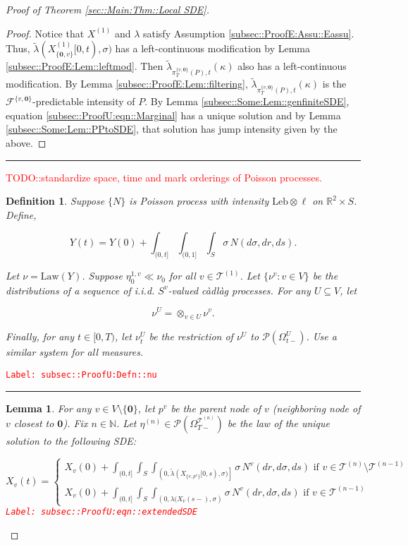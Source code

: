\documentclass[12pt]{article}
\newcommand{\mb}{\mathbb}
\newcommand{\mc}{\mathcal}
\newcommand{\ov}{\overline}
\newcommand{\te}{\text}
\newcommand{\tr}{\textcolor{red}}
\newcommand{\labe}[1]{\tr{\texttt{Label: #1}}}
\newcommand{\lin}{\rule{\linewidth}{0.4 pt}}
\newcommand{\pmsr}{\mc{P}}							%
\renewcommand{\root}{\mathbf{0}}				%
\renewcommand{\v}{v}							%
\renewcommand{\U}{U}							%
\renewcommand{\S}{S}							%
\newcommand{\s}{\sigma}							%
\newcommand{\T}{T}								%
\renewcommand{\t}{t}							%
\newcommand{\sset}{\Omega}						%
\newcommand{\proj}{\pi}							%
\renewcommand{\tt}{s}							%
\newcommand{\F}{\mc{F}}							%
\newcommand{\X}{X}								%
\newcommand{\vind}[1]{^{#1}}					%
\newcommand{\carp}[1]{^{#1}}					%
\newcommand{\vsi}[1]{^{#1}}						%
\newcommand{\cind}[1]{_{#1}}					%
\newcommand{\cl}{\ov}							%
\newcommand{\tp}[1]{(#1)}						%
\newcommand{\tip}[1]{#1}						%
\newcommand{\ts}[1]{_{#1}}						%
\newcommand{\slnvind}[2]{^{#1,#2}}				%
\newcommand{\tree}{\mc{T}}						%
\newcommand{\sln}[1]{^{(#1)}}					%
\newcommand{\poiss}{N}							%
\newcommand{\leb}{\te{Leb}}						%
\newcommand{\Sm}{\ell}							%
\newcommand{\rate}{\lambda}						%
\renewcommand{\r}{r}							%
\newcommand{\alt}[1]{\widetilde{#1}}			%
\newcommand{\pra}[1]{_{#1}}						%
\newcommand{\mm}{\nu}							%
\newcommand{\mmm}{\eta}							%
\newcommand{\law}{\te{Law}}						%
\newcommand{\XX}{Y}								%
\renewcommand{\mark}{\kappa}					%
\newcommand{\rp}{P}								%
\newcommand{\crate}{\alt{\lambda}}				%
\newcommand{\p}{p}								%
\newcommand{\prats}[2]{_{#1,#2}}				%
\newtheorem{lem}[thms]{Lemma}
\newtheorem{defn}[thms]{Definition}
\begin{document}
\begin{proof}[Proof of Theorem \ref{sec::Main:Thm::Local SDE}]
\begin{proof}
Notice that \(\X\sln{1}\) and \(\rate\) satisfy Assumption \ref{subsec::ProofE:Assu::Eassu}. Thus, \(\crate(\X\sln{1}\cind{\{\root,\v\}}\tip{[0,\t)},\s)\) has a left-continuous modification by Lemma \ref{subsec::ProofE:Lem::leftmod}. Then \(\crate\prats{\proj\vsi{\{\v,\root\}}\ts{\T}(\rp)}{\t}(\mark)\) also has a left-continuous modification. By Lemma \ref{subsec::ProofE:Lem::filtering}, \(\crate\prats{\proj\vsi{\{\v,\root\}}\ts{\T}(\rp)}{\t}(\kappa)\) is the \(\F\vsi{\{\v,\root\}}\)-predictable intensity of \(\rp\). By Lemma \ref{subsec::Some:Lem::genfiniteSDE}, equation \eqref{subsec::ProofU:eqn::Marginal} has a unique solution and by Lemma \ref{subsec::Some:Lem::PPtoSDE}, that solution has jump intensity given by the above.

\end{proof}

\lin

\tr{TODO::standardize space, time and mark orderings of Poisson processes.}

\begin{defn}
Suppose \(\{\poiss\}\) is Poisson process with intensity \(\leb\otimes \Sm\) on \(\mb{R}^2\times \S\). Define,

\[\XX\tp{\t} = \XX\tp{0} + \int_{(0,\t]}\int_{(0,1]}\int_\S\s\,\poiss(d\s,d\r,d\tt).\]

Let \(\mm = \law(\XX)\). Suppose \(\mmm\slnvind{1}{\v}\ts{0}\ll\mm\ts{0}\) for all \(\v\in\tree\sln{1}\). Let \(\{\mm\vind{\v}:\v\in V\}\) be the distributions of a sequence of i.i.d. \(\S\carp{\v}\)-valued c\`adl\`ag processes. For any \(\U\subseteq V\), let 

\[\mm\vind{\U} = \otimes_{\v\in\U} \mm\vind{\v}.\]

Finally, for any \(\t\in [0,\T)\), let \(\mm\vind{\U}\ts{\t}\) be the restriction of \(\mm\vind{\U}\) to \(\pmsr(\sset\vsi{\U}\ts{\t-})\). Use a similar system for all measures.
\label{subsec::ProofU:Defn::nu}
\end{defn}
\labe{subsec::ProofU:Defn::nu}

\lin

\begin{lem}
For any \(\v \in V\setminus\{\root\}\), let \(\p\vind{\v}\) be the parent node of \(\v\) (neighboring node of \(\v\) closest to \(\root\)). Fix \(n \in \mb{N}\). Let \(\mmm\sln{n} \in \pmsr\left(\sset\vsi{\tree\sln{n}}\ts{\T-}\right)\) be the law of the unique solution to the following SDE:

\begin{equation}
\X\cind{\v}\tp{\t} = \begin{cases}
\X\cind{\v}\tp{0} + \int_{(0,\t]}\int_\S\int_{\left(0,\crate(\X\cind{\{\v,\p\vind{\v}\}}\tip{[0,\tt)},\s)\right]}\s\,\poiss\vind{\v}(d\r,d\s,d\tt)\te{ if } \v \in \tree\sln{n}\setminus \tree\sln{n-1}\\
\X\cind{\v}\tp{0} + \int_{(0,\t]}\int_\S\int_{\left(0,\rate(\X\cind{\cl{\v}}\tp{\tt-},\s\right)}\s\,\poiss\vind{\v}(d\r,d\s,d\tt)\te{ if } \v \in \tree\sln{n-1}
\end{cases}
\label{subsec::ProofU:eqn::extendedSDE}
\end{equation}
\labe{subsec::ProofU:eqn::extendedSDE}


\end{lem}
\end{proof}
\end{document}
